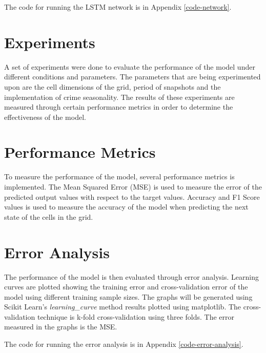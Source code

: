     The code for running the LSTM network is in Appendix \ref{code-network}.

\section{Experiments}
    A set of experiments were done to evaluate the performance of the model under different conditions and parameters. The parameters that are being experimented upon are the cell dimensions of the grid, period of snapshots and the implementation of crime seasonality. The results of these experiments are measured through certain performance metrics in order to determine the effectiveness of the model.

\section{Performance Metrics}
    To measure the performance of the model, several performance metrics is implemented. The Mean Squared Error (MSE) is used to measure the error of the predicted output values with respect to the target values. Accuracy and F1 Score values is used to measure the accuracy of the model when predicting the next state of the cells in the grid.

\section{Error Analysis}
    The performance of the model is then evaluated through error analysis. Learning curves are plotted showing the training error and cross-validation error of the model using different training sample sizes. The graphs will be generated using Scikit Learn's \textit{learning\_curve} method results plotted using matplotlib. The cross-validation technique is k-fold cross-validation using three folds. The error measured in the graphs is the MSE.

    The code for running the error analysis is in Appendix \ref{code-error-analysis}.
